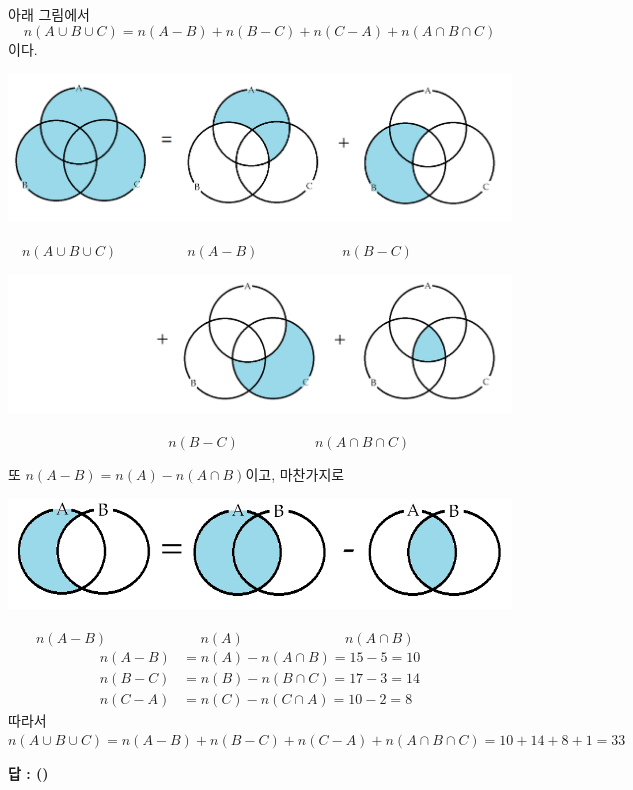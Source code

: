 \documentclass{oblivoir}
\newcounter{num}
\begin{document}
\begin{mdframed}
아래 그림에서
\begin{equation}\label{eq1}
n(A\cup B\cup C)=n(A-B)+n(B-C)+n(C-A)+n(A\cap B\cap C)
\end{equation}
이다.
\par
\includegraphics[width=.9\textwidth]{three_set_numbers_1}
\par\vspace{-10pt}
\(\quad n(A\cup B\cup C)\qquad\qquad\quad n(A-B)
\qquad\qquad\qquad n(B-C)\)
\par
\includegraphics[width=.9\textwidth]{three_set_numbers_2}
\par\vspace{-10pt}
\(\qquad\qquad\qquad\qquad\qquad\quad\:\: n(B-C)
\qquad\qquad\quad\:\: n(A\cap B\cap C)\)
\par
또 \(n(A-B)=n(A)-n(A\cap B)\)이고, 마찬가지로
\par
\includegraphics[width=.9\textwidth]{three_set_numbers_3}
\par\vspace{-10pt}
\(\qquad n(A-B)\qquad\qquad\qquad\:\:\: n(A)
\qquad\qquad\qquad\quad\:n(A\cap B)\)
\begin{equation}\label{eq2}
\begin{aligned}
n(A-B)&=n(A)-n(A\cap B)=15-5=10\\
n(B-C)&=n(B)-n(B\cap C)=17-3=14\\
n(C-A)&=n(C)-n(C\cap A)=10-2=8
\end{aligned}
\end{equation}
따라서
\(n(A\cup B\cup C)=n(A-B)+n(B-C)+n(C-A)+n(A\cap B\cap C)=10+14+8+1=33\)
\end{mdframed}
{\par
\raggedleft\textbf{답 : (\qquad{}\qquad\qquad)}
\par}
\end{document}
